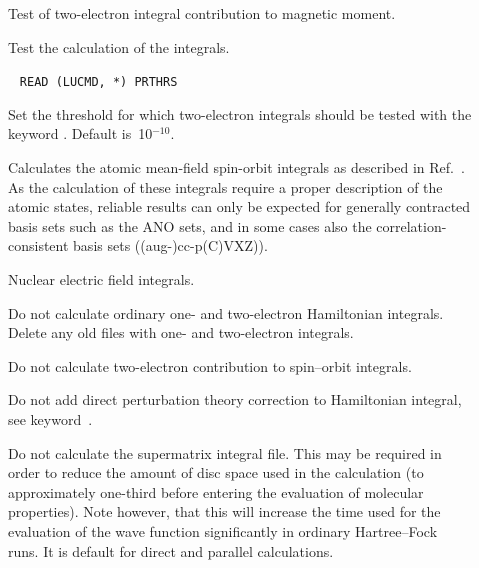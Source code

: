 \begin{description}
\item[] Test of two-electron integral contribution to
magnetic moment.

\item[] Test the calculation of the 
integrals.

\item[]\verb| |\newline
\verb|READ (LUCMD, *) PRTHRS|

Set the threshold for which two-electron integrals should be tested
 with the keyword . Default is~10$^{-10}$.

\item[] Calculates the atomic mean-field spin-orbit
 integrals as described in Ref.~\cite{bahcmmuwogcpl251}. As the
 calculation of these 
 integrals require a proper description of the atomic states, reliable
 results can only be expected for generally contracted basis sets such
 as the ANO sets, and in some cases also the correlation-consistent
 basis sets ((aug-)cc-p(C)VXZ)).

\item[] Nuclear electric field integrals.


\item[] Do not calculate ordinary one- and two-electron
  Hamiltonian integrals. Delete any old files with one- and two-electron integrals.

\item[] Do not calculate two-electron contribution to
  spin--orbit integrals.

\item[] Do not add direct perturbation theory correction
  to Hamiltonian integral, see keyword~.

\item[] Do not calculate the supermatrix
integral file.
This may be required in order to reduce the amount of disc space used
in the calculation (to approximately one-third before entering the
evaluation of molecular properties).
Note however, that this will increase the time used for the evaluation
of the wave function
significantly in ordinary Hartree--Fock runs. It is default for direct and
parallel calculations.


\end{description}
